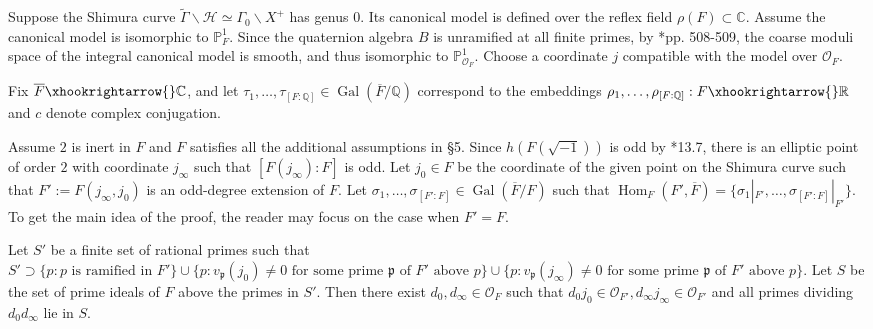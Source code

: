 \documentclass{amsart}
\numberwithin{equation}{subsection}
\numberwithin{theorem}{section}
\theoremstyle{definition}
\theoremstyle{remark}
\newcommand{\bC}{\mathbb{C}}
\newcommand{\bP}{\mathbb{P}}
\newcommand{\bQ}{\mathbb{Q}}
\newcommand{\bR}{\mathbb{R}}
\newcommand{\cH}{\mathcal{H}}
\newcommand{\cO}{\mathcal{O}}
\newcommand{\fp}{\mathfrak{p}}
\DeclareMathOperator{\Gal}{Gal}
\DeclareMathOperator{\Hom}{Hom}
\begin{document}
Suppose the Shimura curve $\widetilde{\Gamma} \backslash \cH \simeq \Gamma_0\backslash X^+$ has genus $0$. Its canonical model is defined over the reflex field $\rho(F) \subset \bC$. Assume the canonical model is isomorphic to $\mathbb{P}^1_F$. Since the quaternion algebra $B$ is unramified at all finite primes, by \cite{MR772569}*{pp. 508-509}, the coarse moduli space of the integral canonical model is smooth, and thus isomorphic to $\bP^1_{\cO_F}$.   
Choose a coordinate $j$ compatible with the model over $\cO_F$. 



Fix $\overline{F}\xhookrightarrow{} \bC$, and let $\tau_1, \dotsc, \tau_{[F:\bQ]} \in \Gal(\overline{F}/\bQ)$ correspond to the embeddings $\rho_1, \dotsc, \rho_{[F:\bQ]}: F\xhookrightarrow{}\bR$ and $c$ denote complex conjugation. 

Assume $2$ is inert in $F$ and $F$ satisfies all the additional assumptions in \S5. Since $h(F(\sqrt{-1}))$ is odd by \cite{MR963648}*{13.7}, there is an elliptic point of order $2$ with coordinate $j_{\infty}$ such that $[F(j_{\infty}):F]$ is odd. 
Let $j_0 \in F$ be the coordinate of the given point on the Shimura curve such that $F' := F(j_{\infty}, j_0)$ is an odd-degree extension of $F$. Let $\sigma_1, \dotsc, \sigma_{[F':F]} \in \Gal(\overline{F}/F)$ such that $\Hom_F(F', \overline{F}) = \{\sigma_1|_{F'}, \dotsc, \sigma_{[F':F]}|_{F'}\}$. To get the main idea of the proof, the reader may focus on the case when $F' = F$. 

Let $S'$ be a finite set of rational primes such that $S' \supset \{p: p \text{ is ramified in } F'\} \cup \{p: v_{\fp}(j_0) \neq 0 \text{ for some prime } \fp \text{ of } F' \text{ above } p\} \cup \{p: v_{\fp}(j_{\infty}) \neq 0 \text{ for some prime } \fp \text { of } F' \text{ above } p\}$. Let $S$ be the set of prime ideals of $F$ above the primes in $S'$. Then there exist $d_0, d_{\infty}\in \cO_F$ such that $d_0j_0 \in \cO_{F'}, d_{\infty}j_{\infty}\in \cO_{F'}$ and all primes dividing $d_0d_{\infty}$ lie in $S$. 



\subsection{} \label{sec:main1}
\end{document}
